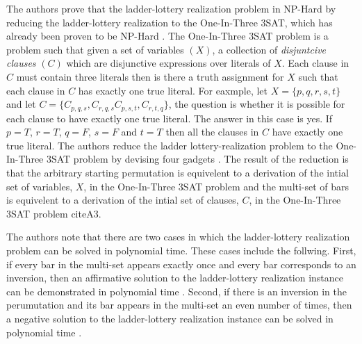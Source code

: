 \pagebreak
The authors prove that the ladder-lottery realization problem in NP-Hard
by reducing the ladder-lottery realization to the One-In-Three 3SAT, 
which has already been proven to be NP-Hard \cite{A3}. The One-In-Three 3SAT 
problem is a problem such that given a set of variables $(X)$, a collection 
of \emph{disjuntcive clauses} $(C)$ which are disjunctive expressions over 
literals of $X$. Each clause in $C$ 
must contain three literals then is there a truth assignment for $X$ such that 
each clause in $C$ has exactly one true literal. For eaxmple, let 
$X=\{p, q, r, s, t\}$ and let $C=\{C_{p,q,s}, C_{r,q,s} C_{p,s,t}, C_{r,t,q}\}$,
the question is whether it is possible for each clause to have exactly one
true literal. The answer in this case is yes. If $p=T$, $r=T$, $q=F$, $s=F$
 and $t=T$ then all the clauses in $C$ have exactly one true literal. 
 The authors reduce the ladder lottery-realization problem to the
One-In-Three 3SAT problem by devising four gadgets \cite{A3}. The result of 
the reduction is that the arbitrary starting permutation is equivelent 
to a derivation of the intial set of variables, $X$, in the One-In-Three 3SAT 
problem and the multi-set of bars is equivelent to a 
derivation of the intial set of clauses, $C$, in the One-In-Three 
3SAT problem cite{A3}.\par 
The authors note that there are two cases in which the ladder-lottery
realization problem can be solved in polynomial time. These cases 
include the follwing. First, if every bar in the multi-set appears
exactly once and every bar corresponds to an inversion, 
then an affirmative solution to the ladder-lottery realization 
instance can be demonstrated in polynomial time \cite{A3}. 
Second, if there is an inversion in the perumutation and its bar appears in the multi-set an even 
number of times, then a negative solution to
the ladder-lottery realization instance
can be solved in polynomial time \cite{A3}.\par